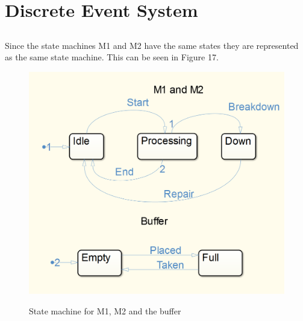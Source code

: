 \documentclass[12pt,a4paper]{article}
\begin{document}


\section{Discrete Event System}
\subsection{}
Since the state machines M1 and M2 have the same states they are represented as the same state machine. This can be seen in Figure 17.	
\begin{center}
	\begin{figure}[H]
      \centering
	\includegraphics[scale=0.5]{des1.png}
	\label{fig:des1}
	\caption{State machine for M1, M2 and the buffer}
	\end{figure}
\end{center}
\end{document}
